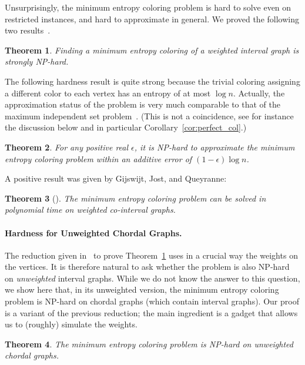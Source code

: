 \documentclass[10pt,a4paper]{article}
\newtheorem{theorem}{Theorem}
\begin{document}
Unsurprisingly, the minimum entropy coloring problem is hard to solve even on restricted instances, and hard to approximate in general. We proved the following two results~\cite{CFJ07}.

\begin{theorem}
\label{thm:hardinterval}
Finding a minimum entropy coloring of a weighted interval graph is strongly NP-hard.
\end{theorem}

The following hardness result is quite strong because the trivial coloring assigning a different color to each vertex has an entropy of at most $\log n$. Actually, the approximation status of the problem is very much comparable to that of the maximum independent set problem~\cite{H99}. (This is not a coincidence, see for instance the discussion below and in particular Corollary~\ref{cor:perfect_col}.)

\begin{theorem}
\label{thm:minentcol_inapx}
For any positive real $\epsilon$, it is NP-hard to approximate the minimum entropy coloring problem within an additive error of $(1 - \epsilon) \log n$.
\end{theorem}

A positive result was given by Gijswijt, Jost, and Queyranne:
\begin{theorem}[\cite{GJQ07}]
The minimum entropy coloring problem can be solved in polynomial time on weighted co-interval graphs.
\end{theorem}

\paragraph{Hardness for Unweighted Chordal Graphs.}

The reduction given in~\cite{CFJ07} to prove Theorem~\ref{thm:hardinterval} uses in a crucial
way the weights on the vertices. It is therefore natural to ask whether the problem is also
NP-hard on {\em unweighted} interval graphs. While we do not know the answer to this question,
we show here that, in its unweighted version, the minimum entropy coloring problem 
is NP-hard on chordal graphs (which contain interval graphs). Our proof is a variant
of the previous reduction; the main ingredient is a gadget that allows us to (roughly) 
simulate the weights.

\begin{theorem}
\label{hardchord}
The minimum entropy coloring problem is NP-hard on unweighted chordal graphs.
\end{theorem}
\end{document}
